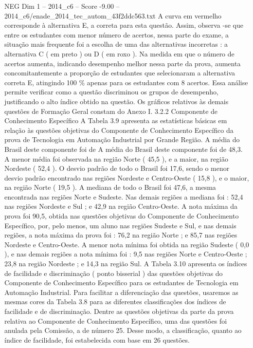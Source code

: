 \begin{textsample}{NEG Dim 1 – 2014\_c6 – Score -9.00 – 2014\_c6/enade\_2014\_tec\_autom\_43f2ddc563.txt}
A curva em vermelho corresponde à alternativa E, a correta para esta questão.
Assim, observa -se que entre os estudantes com menor número de acertos, nessa parte do exame, a situação mais frequente foi a escolha de uma das alternativas incorretas : a alternativa C ( em preto ) ou D ( em roxo ).
Na medida em que o número de acertos aumenta, indicando desempenho melhor nessa parte da prova, aumenta concomitantemente a proporção de estudantes que selecionaram a alternativa correta E, atingindo 100 \% apenas para os estudantes com 8 acertos.
Essa análise permite verificar como a questão discriminou os grupos de desempenho, justificando o alto índice obtido na questão.
Os gráficos relativos às demais questões de Formação Geral constam do Anexo I. 3.2.2 Componente de Conhecimento Específico A Tabela 3.9 apresenta as estatísticas básicas em relação às questões objetivas do Componente de Conhecimento Específico da prova de Tecnologia em Automação Industrial por Grande Região.
A média do Brasil deste componente foi de A média do Brasil deste componente foi de 48,3.
A menor média foi observada na região Norte ( 45,5 ), e a maior, na região Nordeste ( 52,4 ).
O desvio padrão de todo o Brasil foi 17,6, sendo o menor desvio padrão encontrado nas regiões Nordeste e Centro-Oeste ( 15,8 ), e o maior, na região Norte ( 19,5 ).
A mediana de todo o Brasil foi 47,6, a mesma encontrada nas regiões Norte e Sudeste.
Nas demais regiões a mediana foi : 52,4 nas regiões Nordeste e Sul ; e 42,9 na região Centro-Oeste.
A nota máxima da prova foi 90,5, obtida nas questões objetivas do Componente de Conhecimento Específico, por, pelo menos, um aluno nas regiões Sudeste e Sul, e nas demais regiões, a nota máxima da prova foi : 76,2 na região Norte ; e 85,7 nas regiões Nordeste e Centro-Oeste.
A menor nota mínima foi obtida na região Sudeste ( 0,0 ), e nas demais regiões a nota mínima foi : 9,5 nas regiões Norte e Centro-Oeste ; 23,8 na região Nordeste ; e 14,3 na região Sul.
A Tabela 3.10 apresenta os índices de facilidade e discriminação ( ponto bisserial ) das questões objetivas do Componente de Conhecimento Específico para os estudantes de Tecnologia em Automação Industrial.
Para facilitar a diferenciação das questões, usaremos as mesmas cores da Tabela 3.8 para as diferentes classificações dos índices de facilidade e de discriminação.
Dentre as questões objetivas da parte da prova relativa ao Componente de Conhecimento Específico, uma das questões foi anulada pela Comissão, a de número 25.
Desse modo, a classificação, quanto ao índice de facilidade, foi estabelecida com base em 26 questões.

\end{textsample}
